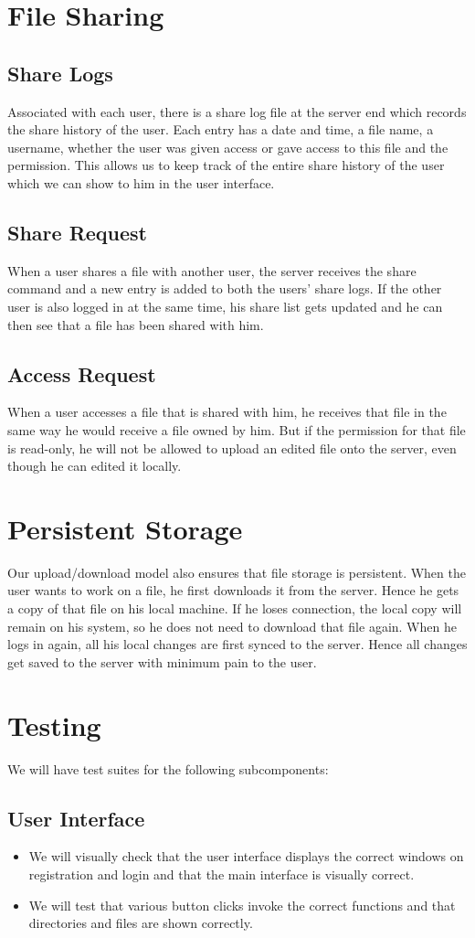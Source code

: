 \documentclass[]{article}
\begin{document}
\section{File Sharing}
\subsection{Share Logs}
Associated with each user, there is a share log file at the server end which records the share history of the user. Each entry has a date and time, a file name, a username, whether the user was given access or gave access to this file and the permission. This allows us to keep track of the entire share history of the user which we can show to him in the user interface.
\subsection{Share Request}
When a user shares a file with another user, the server receives the share command and a new entry is added to both the users' share logs. If the other user is also logged in at the same time, his share list gets updated and he can then see that a file has been shared with him.
\subsection{Access Request}
When a user accesses a file that is shared with him, he receives that file in the same way he would receive a file owned by him. But if the permission for that file is read-only, he will not be allowed to upload an edited file onto the server, even though he can edited it locally.
\section{Persistent Storage}
Our upload/download model also ensures that file storage is persistent. When the user wants to work on a file, he first downloads it from the server. Hence he gets a copy of that file on his local machine. If he loses connection, the local copy will remain on his system, so he does not need to download that file again. When he logs in again, all his local changes are first synced to the server. Hence all changes get saved to the server with minimum pain to the user.
\section{Testing}
We will have test suites for the following subcomponents:
\subsection{User Interface}
\begin{itemize}
\item We will visually check that the user interface displays the correct windows on registration and login and that the main interface is visually correct.
\item We will test that various button clicks invoke the correct functions and that directories and files are shown correctly.
\end{itemize}
\end{document}
